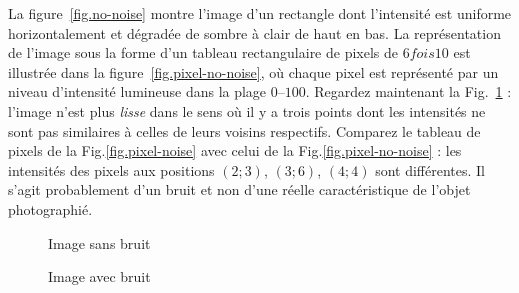 La figure~\ref{fig.no-noise} montre l'image d'un rectangle dont l'intensité est uniforme horizontalement et dégradée de sombre à clair de haut en bas. La représentation de l'image sous la forme d'un tableau rectangulaire de pixels de $6 fois 10$ est illustrée dans la figure~\ref{fig.pixel-no-noise}, où chaque pixel est représenté par un niveau d'intensité lumineuse dans la plage $0$--$100$. Regardez maintenant la Fig.~\ref{fig.noise} : l'image n'est plus \emph{lisse} dans le sens où il y a trois points dont les intensités ne sont pas similaires à celles de leurs voisins respectifs. Comparez le tableau de pixels de la Fig.\ref{fig.pixel-noise} avec celui de la Fig.\ref{fig.pixel-no-noise} : les intensités des pixels aux positions $(2;3)$, $(3;6)$, $(4;4)$ sont différentes. Il s'agit probablement d'un bruit et non d'une réelle caractéristique de l'objet photographié. 

\begin{figure}
\begin{minipage}{.45\textwidth}
\caption{Image sans bruit}\label{fig.no-noise}
\end{minipage}
\hspace{\fill}
\begin{minipage}{.45\textwidth}
\caption{Image avec bruit}\label{fig.noise}
\end{minipage}
\end{figure}

